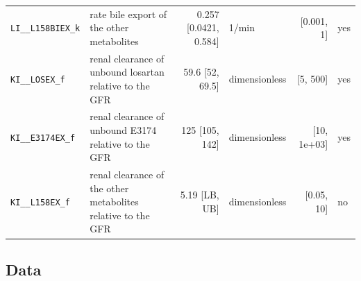\begin{longtable}{llrlrl}
\texttt{LI\_\_L158BIEX\_k} & rate bile export of the other metabolites & 0.257 [0.0421, 0.584] & 1/min & [0.001, 1] & yes \\
\texttt{KI\_\_LOSEX\_f} & renal clearance of unbound losartan relative to the GFR & 59.6 [52, 69.5] & dimensionless & [5, 500] & yes \\
\texttt{KI\_\_E3174EX\_f} & renal clearance of unbound E3174 relative to the GFR & 125 [105, 142] & dimensionless & [10, 1e+03] & yes \\
\texttt{KI\_\_L158EX\_f} & renal clearance of the other metabolites relative to the GFR & 5.19 [LB, UB] & dimensionless & [0.05, 10] & no \\
\end{longtable}

\subsection{Data}

